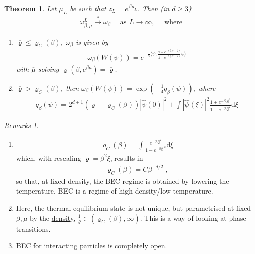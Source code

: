 \documentclass[
a4paper, %
11pt, %
onecolumn, %
openany, %
]{memoir}
\theoremstyle{definition}
\theoremstyle{remark}
\newtheorem{remarks}[definition]{Remarks}
\theoremstyle{plain}
\newtheorem{theorem}[definition]{Theorem}
\begin{document}
\begin{theorem}
	Let $\mu_L$ be such that $z_L=e^{\beta\mu_L}$. Then (in $d\geq 3$) \begin{align}
	\omega_{\beta,\mu}^L\overset{*}{\longrightarrow}\omega_{\beta}\quad \text{ as }L\rightarrow\infty,\quad \text{ where}
	\end{align}\begin{enumerate}
		\item $\overline{\varrho}\leq \varrho_C(\beta)$, $\omega_{\beta}$ is given by \begin{align}\omega_{\beta}(W(\psi))=e^{-\frac{1}{4}\langle \psi, \frac{\mathds{1}+e^{-\beta (H-\overline{\mu})}}{\mathds{1}-e^{-\beta(H-\overline{\mu})}}\psi\rangle}\end{align} with $\overline{\mu}$ solving $\varrho(\beta,e^{\beta\mu})=\overline{\varrho}$.
		\item $\overline{\varrho}>\varrho_C(\beta)$, then $\omega_{\beta}(W(\psi))=\exp(-\frac{1}{4}q_{\beta}(\psi))$, where\begin{align}
		q_{\beta}(\psi)=2^{d+1}(\overline{\varrho}-\varrho_C(\beta))|\hat{\psi}(0)|^2+\int|\hat{\psi}(\xi)|^2\frac{1+e^{-\beta|\xi|^2}}{1-e^{-\beta|\xi|^2}}\mathrm{d}\xi\end{align}
	\end{enumerate}
\end{theorem}
\begin{remarks}
	\begin{enumerate}
		\item \begin{align}\varrho_C(\beta)=\int\frac{e^{-\beta|\xi|^2}}{1-e^{-\beta|\xi|^2}}\mathrm{d}\xi\end{align} which, with rescaling $\varrho=\beta^2\xi$, results in \begin{align}
		\varrho_C(\beta)=C\beta^{-d/2}\;,
		\end{align}
		so that, at fixed density, the BEC regime is obtained by lowering the temperature. BEC is a regime of high density/low temperature.
		\item Here, the thermal equilibrium state is not unique, but parametrised at fixed $\beta,\mu$ by the \underline{density}, $\frac{1}{\varrho}\in (\varrho_C(\beta),\infty)$. This is a way of looking at phase transitions.
		\item BEC for interacting particles is completely open.
	\end{enumerate}
\end{remarks}
\end{document}
